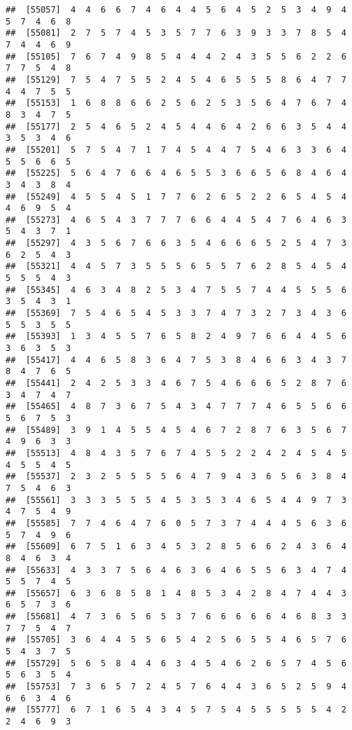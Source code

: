\documentclass[
]{book}
\begin{document}
\begin{verbatim}
##  [55057]  4  4  6  6  7  4  6  4  4  5  6  4  5  2  5  3  4  9  4  5  7  4  6  8
##  [55081]  2  7  5  7  4  5  3  5  7  7  6  3  9  3  3  7  8  5  4  7  4  4  6  9
##  [55105]  7  6  7  4  9  8  5  4  4  4  2  4  3  5  5  6  2  2  6  7  7  5  4  8
##  [55129]  7  5  4  7  5  5  2  4  5  4  6  5  5  5  8  6  4  7  7  4  4  7  5  5
##  [55153]  1  6  8  8  6  6  2  5  6  2  5  3  5  6  4  7  6  7  4  8  3  4  7  5
##  [55177]  2  5  4  6  5  2  4  5  4  4  6  4  2  6  6  3  5  4  4  3  5  3  4  6
##  [55201]  5  7  5  4  7  1  7  4  5  4  4  7  5  4  6  3  3  6  4  5  5  6  6  5
##  [55225]  5  6  4  7  6  6  4  6  5  5  3  6  6  5  6  8  4  6  4  3  4  3  8  4
##  [55249]  4  5  5  4  5  1  7  7  6  2  6  5  2  2  6  5  4  5  4  4  6  9  5  4
##  [55273]  4  6  5  4  3  7  7  7  6  6  4  4  5  4  7  6  4  6  3  5  4  3  7  1
##  [55297]  4  3  5  6  7  6  6  3  5  4  6  6  6  5  2  5  4  7  3  6  2  5  4  3
##  [55321]  4  4  5  7  3  5  5  5  6  5  5  7  6  2  8  5  4  5  4  5  5  5  4  3
##  [55345]  4  6  3  4  8  2  5  3  4  7  5  5  7  4  4  5  5  5  6  3  5  4  3  1
##  [55369]  7  5  4  6  5  4  5  3  3  7  4  7  3  2  7  3  4  3  6  5  5  3  5  5
##  [55393]  1  3  4  5  5  7  6  5  8  2  4  9  7  6  6  4  4  5  6  3  6  3  5  3
##  [55417]  4  4  6  5  8  3  6  4  7  5  3  8  4  6  6  3  4  3  7  8  4  7  6  5
##  [55441]  2  4  2  5  3  3  4  6  7  5  4  6  6  6  5  2  8  7  6  3  4  7  4  7
##  [55465]  4  8  7  3  6  7  5  4  3  4  7  7  7  4  6  5  5  6  6  5  6  7  5  3
##  [55489]  3  9  1  4  5  5  4  5  4  6  7  2  8  7  6  3  5  6  7  4  9  6  3  3
##  [55513]  4  8  4  3  5  7  6  7  4  5  5  2  2  4  2  4  5  4  5  4  5  5  4  5
##  [55537]  2  3  2  5  5  5  5  6  4  7  9  4  3  6  5  6  3  8  4  7  5  4  6  3
##  [55561]  3  3  3  5  5  5  4  5  3  5  3  4  6  5  4  4  9  7  3  4  7  5  4  9
##  [55585]  7  7  4  6  4  7  6  0  5  7  3  7  4  4  4  5  6  3  6  5  7  4  9  6
##  [55609]  6  7  5  1  6  3  4  5  3  2  8  5  6  6  2  4  3  6  4  8  4  6  3  4
##  [55633]  4  3  3  7  5  6  4  6  3  6  4  6  5  5  6  3  4  7  4  5  5  7  4  5
##  [55657]  6  3  6  8  5  8  1  4  8  5  3  4  2  8  4  7  4  4  3  6  5  7  3  6
##  [55681]  4  7  3  6  5  6  5  3  7  6  6  6  6  6  4  6  8  3  3  7  7  5  4  7
##  [55705]  3  6  4  4  5  5  6  5  4  2  5  6  5  5  4  6  5  7  6  5  4  3  7  5
##  [55729]  5  6  5  8  4  4  6  3  4  5  4  6  2  6  5  7  4  5  6  5  6  3  5  4
##  [55753]  7  3  6  5  7  2  4  5  7  6  4  4  3  6  5  2  5  9  4  6  6  3  4  6
##  [55777]  6  7  1  6  5  4  3  4  5  7  5  4  5  5  5  5  5  4  2  2  4  6  9  3

\end{verbatim}
\end{document}
